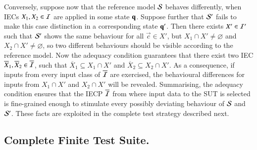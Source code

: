 Conversely, suppose now that
 the reference model  ${\cal S}$ behaves differently, when IECs $X_1, X_2\in {\cal I}$
are applied in some state $\textbf{q}$. Suppose further that ${\cal S}'$ fails to make this case 
distinction in a corresponding state $\textbf{q}'$. Then there exists $X'\in {\cal I}'$ such that
 ${\cal S}'$ shows the same behaviour for all $\vec c\in X'$, but $X_1\cap X'\neq \varnothing$
 and $X_2\cap X'\neq \varnothing$, so two different behaviours should be visible according
 to the reference model. Now the adequacy condition guarantees that there exist two IEC
$\overline{X}_1, \overline{X}_2\in \overline{{\cal I}}$, such that 
$\overline{X}_1\subseteq X_1\cap X'$ and 
$\overline{X}_2\subseteq X_2\cap X'$.
 As a consequence, if inputs from every input class 
of $\overline{{\cal I}}$ are exercised, the behavioural differences for inputs from
$X_1\cap X'$ and $X_2\cap X'$ will be revealed. Summarising, the adequacy condition ensures that 
the IECP $\overline{{\cal I}}$ from where input data to the SUT is selected is fine-grained 
enough to stimulate every possibly deviating behaviour of ${\cal S}$ and ${\cal S}'$. These facts
are exploited in the complete test strategy described next.
 
 
 

\subsection{Complete Finite Test Suite.}

